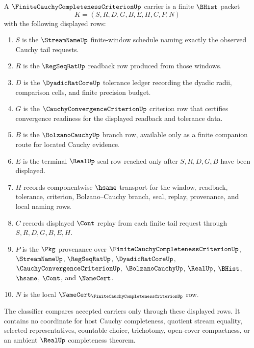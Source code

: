 \begin{definition}
\label{def:finite-cauchy-completeness-criterion-carrier}
A $\FiniteCauchyCompletenessCriterionUp$ carrier is a finite $\BHist$ packet
$$
K=(S,R,D,G,B,E,H,C,P,N)
$$
with the following displayed rows:
\begin{enumerate}
\item $S$ is the $\StreamNameUp$ finite-window schedule naming exactly the observed Cauchy tail requests.
\item $R$ is the $\RegSeqRatUp$ readback row produced from those windows.
\item $D$ is the $\DyadicRatCoreUp$ tolerance ledger recording the dyadic radii, comparison cells, and finite precision budget.
\item $G$ is the $\CauchyConvergenceCriterionUp$ criterion row that certifies convergence readiness for the displayed readback and tolerance data.
\item $B$ is the $\BolzanoCauchyUp$ branch row, available only as a finite companion route for located Cauchy evidence.
\item $E$ is the terminal $\RealUp$ seal row reached only after $S,R,D,G,B$ have been displayed.
\item $H$ records componentwise $\hsame$ transport for the window, readback, tolerance, criterion, Bolzano--Cauchy branch, seal, replay, provenance, and local naming rows.
\item $C$ records displayed $\Cont$ replay from each finite tail request through $S,R,D,G,B,E,H$.
\item $P$ is the $\Pkg$ provenance over $\FiniteCauchyCompletenessCriterionUp$, $\StreamNameUp$, $\RegSeqRatUp$, $\DyadicRatCoreUp$, $\CauchyConvergenceCriterionUp$, $\BolzanoCauchyUp$, $\RealUp$, $\BHist$, $\hsame$, $\Cont$, and $\NameCert$.
\item $N$ is the local $\NameCert_{\FiniteCauchyCompletenessCriterionUp}$ row.
\end{enumerate}
The classifier compares accepted carriers only through these displayed rows. It contains no coordinate for host Cauchy completeness, quotient stream equality, selected representatives, countable choice, trichotomy, open-cover compactness, or an ambient $\RealUp$ completeness theorem.
\end{definition}

